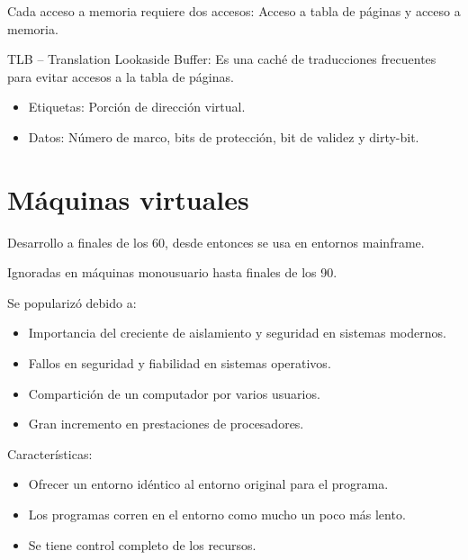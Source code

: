 \documentclass[12pt, twoside, openright]{report} %
\begin{document}
  
    Cada acceso a memoria requiere dos accesos: Acceso a tabla de
    páginas y acceso a memoria.

    TLB -- Translation Lookaside Buffer: Es una caché de traducciones
    frecuentes para evitar accesos a la tabla de páginas.

    \begin{itemize}
    
    \item
      Etiquetas: Porción de dirección virtual.
    \item
      Datos: Número de marco, bits de protección, bit de validez y
      dirty-bit.
    \end{itemize}

    \pagebreak
\section{Máquinas virtuales}

    Desarrollo a finales de los 60, desde entonces se usa en entornos
    mainframe.

    
  Ignoradas en máquinas monousuario hasta finales de los 90.

  
    Se popularizó debido a:
    \vspace{-0.5cm}

    \begin{itemize}
    
    \item
      Importancia del creciente de aislamiento y seguridad en sistemas
      modernos.
    \item
      Fallos en seguridad y fiabilidad en sistemas operativos.
    \item
      Compartición de un computador por varios usuarios.
    \item
      Gran incremento en prestaciones de procesadores.
    \end{itemize}

    Características:
    \vspace{-0.5cm}

    \begin{itemize}
    
    \item
      Ofrecer un entorno idéntico al entorno original para el programa.
    \item
      Los programas corren en el entorno como mucho un poco más lento.
    \item
      Se tiene control completo de los recursos.
    \end{itemize}
\end{document}
